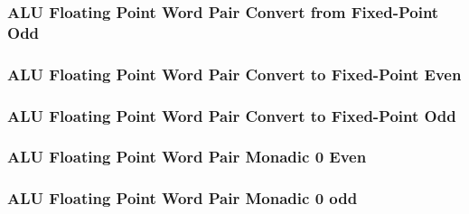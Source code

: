 

\subsubsection[{\small ALU Floating Point Word Pair Convert from Fixed-Point Odd}]{ALU Floating Point Word Pair Convert from Fixed-Point Odd} \label{sec:format-ALU-FWPFLOATO}



\subsubsection[{\small ALU Floating Point Word Pair Convert to Fixed-Point Even}]{ALU Floating Point Word Pair Convert to Fixed-Point Even} \label{sec:format-ALU-FWPFIXEDE}



\subsubsection[{\small ALU Floating Point Word Pair Convert to Fixed-Point Odd}]{ALU Floating Point Word Pair Convert to Fixed-Point Odd} \label{sec:format-ALU-FWPFIXEDO}



\subsubsection[{\small ALU Floating Point Word Pair Monadic 0 Even}]{ALU Floating Point Word Pair Monadic 0 Even} \label{sec:format-ALU-FWPMO0E}



\subsubsection[{\small ALU Floating Point Word Pair Monadic 0 odd}]{ALU Floating Point Word Pair Monadic 0 odd} \label{sec:format-ALU-FWPMO0O}

